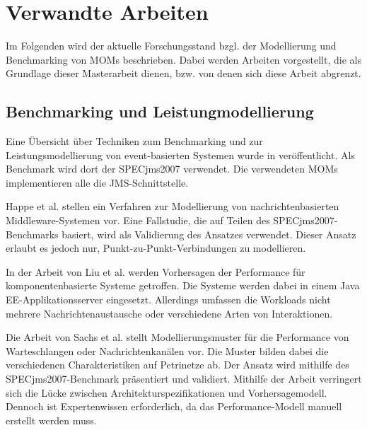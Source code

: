 
\chapter{Verwandte Arbeiten}
\label{ch:Verwandte}
Im Folgenden wird der aktuelle Forschungsstand bzgl. der Modellierung und Benchmarking von MOMs beschrieben. Dabei werden Arbeiten vorgestellt, die als Grundlage dieser Masterarbeit dienen, bzw. von denen sich diese Arbeit abgrenzt.

\section{Benchmarking und Leistungmodellierung}
Eine Übersicht über Techniken zum Benchmarking und zur Leistungsmodellierung von event-basierten Systemen wurde in \cite{Kounev2009} veröffentlicht. Als Benchmark wird dort der SPECjms2007 verwendet. Die verwendeten MOMs implementieren alle die JMS-Schnittstelle. \par
Happe et al. \cite{happe} stellen ein Verfahren zur Modellierung von nachrichtenbasierten Middleware-Systemen vor. 
Eine Fallstudie, die auf Teilen des SPECjms2007-Benchmarks basiert, wird als Validierung des Ansatzes verwendet. Dieser Ansatz erlaubt es jedoch nur, Punkt-zu-Punkt-Verbindungen zu modellieren. \par
In der Arbeit von Liu et al. \cite{Liu2005} werden Vorhersagen der Performance für komponentenbasierte Systeme getroffen. Die Systeme werden dabei in einem Java EE-Applikationsserver eingesetzt. Allerdings umfassen die Workloads nicht mehrere Nachrichtenaustausche oder verschiedene Arten von Interaktionen. \par
Die Arbeit von Sachs et al. \cite{Sachs2013} stellt Modellierungsmuster für die Performance von Warteschlangen oder Nachrichtenkanälen vor. Die Muster bilden dabei die verschiedenen Charakteristiken auf Petrinetze ab. Der Ansatz wird mithilfe des \\ SPECjms2007-Benchmark präsentiert und validiert. Mithilfe der Arbeit verringert sich die Lücke zwischen Architekturspezifikationen und Vorhersagemodell. Dennoch ist Expertenwissen erforderlich, da das Performance-Modell manuell erstellt werden muss. \par
